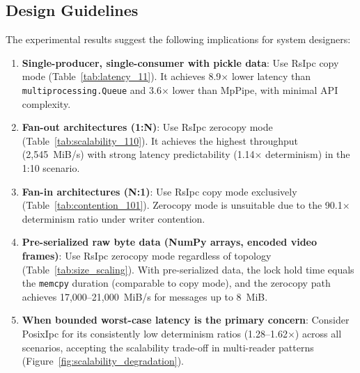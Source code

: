\subsection{Design Guidelines}

The experimental results suggest the following implications for system designers:

\begin{enumerate}
    \item \textbf{Single-producer, single-consumer with pickle data}: Use RsIpc copy mode (Table~\ref{tab:latency_11}). It achieves 8.9$\times$ lower latency than \texttt{multiprocessing.Queue} and 3.6$\times$ lower than MpPipe, with minimal API complexity.

    \item \textbf{Fan-out architectures (1:N)}: Use RsIpc zerocopy mode (Table~\ref{tab:scalability_110}). It achieves the highest throughput (2,545~MiB/s) with strong latency predictability (1.14$\times$ determinism) in the 1:10 scenario.

    \item \textbf{Fan-in architectures (N:1)}: Use RsIpc copy mode exclusively (Table~\ref{tab:contention_101}). Zerocopy mode is unsuitable due to the 90.1$\times$ determinism ratio under writer contention.

    \item \textbf{Pre-serialized raw byte data (NumPy arrays, encoded video frames)}: Use RsIpc zerocopy mode regardless of topology (Table~\ref{tab:size_scaling}). With pre-serialized data, the lock hold time equals the \texttt{memcpy} duration (comparable to copy mode), and the zerocopy path achieves 17,000--21,000~MiB/s for messages up to 8~MiB.

    \item \textbf{When bounded worst-case latency is the primary concern}: Consider PosixIpc for its consistently low determinism ratios (1.28--1.62$\times$) across all scenarios, accepting the scalability trade-off in multi-reader patterns (Figure~\ref{fig:scalability_degradation}).
\end{enumerate}
